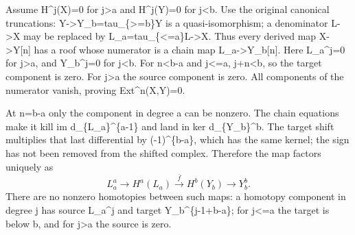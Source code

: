 Assume H\textasciicircum{}j(X)\allowbreak{}\allowbreak{}=0 for j\textgreater a and H\textasciicircum{}j(Y)\allowbreak{}\allowbreak{}=0 for j\textless b. Use the original canonical truncations:\allowbreak{} Y\allowbreak{}->Y\_\allowbreak{}b\allowbreak{}=tau\_\allowbreak{}\{>\allowbreak{}=b\}Y is a quasi-isomorphism; a denominator L\allowbreak{}->X may be replaced by L\_\allowbreak{}a\allowbreak{}=tau\_\allowbreak{}\{<\allowbreak{}=a\}L\allowbreak{}->X. Thus every derived map X\allowbreak{}->Y[n]\allowbreak{} has a roof whose numerator is a chain map L\_\allowbreak{}a\allowbreak{}->Y\_\allowbreak{}b[n]\allowbreak{}. Here L\_\allowbreak{}a\textasciicircum{}j\allowbreak{}=0 for j>a,\allowbreak{} and Y\_\allowbreak{}b\textasciicircum{}j\allowbreak{}=0 for j\textless b. For n\textless b-a and j<\allowbreak{}=a,\allowbreak{} j\allowbreak{}+n<b,\allowbreak{} so the target component is zero. For j\textgreater a the source component is zero. All components of the numerator vanish,\allowbreak{} proving Ext\textasciicircum{}n(X,\allowbreak{}Y)\allowbreak{}\allowbreak{}=0.

At n\allowbreak{}=b-a only the component in degree a can be nonzero. The chain equations make it kill im d\_\allowbreak{}\{L\_\allowbreak{}a\}\textasciicircum{}\{a-1\} and land in ker d\_\allowbreak{}\{Y\_\allowbreak{}b\}\textasciicircum{}b. The target shift multiplies that last differential by (-1)\allowbreak{}\textasciicircum{}\{b-a\},\allowbreak{} which has the same kernel; the sign has not been removed from the shifted complex. Therefore the map factors uniquely as \[
 L_a^a\longrightarrow H^a(L_a)
 \xrightarrow{\bar f} H^b(Y_b)
 \longrightarrow Y_b^b.                                    \tag{8.1}
\] There are no nonzero homotopies between such maps:\allowbreak{} a homotopy component in degree j has source L\_\allowbreak{}a\textasciicircum{}j and target Y\_\allowbreak{}b\textasciicircum{}\{j-1\allowbreak{}+b-a\}; for j<\allowbreak{}=a the target is below b,\allowbreak{} and for j\textgreater a the source is zero.

